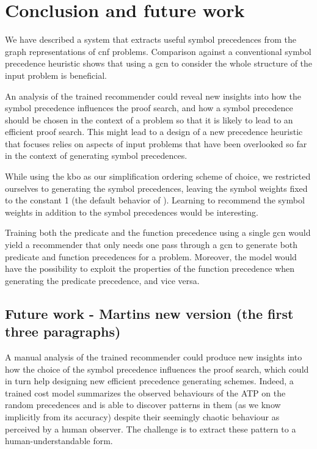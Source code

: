 \documentclass[runningheads]{llncs}
\begin{document}

\section{Conclusion and future work}
\label{sec:conclusion}

We have described a system that extracts useful symbol precedences from the graph representations of \gls{cnf} problems.
Comparison against a conventional symbol precedence heuristic shows that using a \gls{gcn}
to consider the whole structure of the input problem is beneficial.

An analysis of the trained recommender could reveal new insights into how the symbol precedence influences the proof search,
and how a symbol precedence should be chosen in the context of a problem so that it is likely to lead to an efficient proof search.
This might lead to a design of a new precedence heuristic
that focuses relies on aspects of input problems
that have been overlooked so far in the context of generating symbol precedences.

While using the \gls{kbo} as our simplification ordering scheme of choice,
we restricted ourselves to generating the symbol precedences,
leaving the symbol weights fixed to the constant 1 (the default behavior of \Vampire{}).
Learning to recommend the symbol weights in addition to the symbol precedences would be interesting.

Training both the predicate and the function precedence using a single \gls{gcn} would yield a recommender
that only needs one pass through a \gls{gcn} to generate both predicate and function precedences for a problem.
Moreover, the model would have the possibility to exploit the properties of the function precedence
when generating the predicate precedence, and vice versa.

\subsection{Future work - Martins new version (the first three paragraphs)}

A manual analysis of the trained recommender could produce new insights into how the choice of the symbol precedence influences the proof search,
which could in turn help designing new efficient precedence generating schemes.
Indeed, a trained cost model summarizes the observed behaviours of the ATP on the random precedences
and is able to discover patterns in them (as we know implicitly from its accuracy) 
despite their seemingly chaotic behaviour as perceived by a human observer.
The challenge is to extract these pattern to a human-understandable form.
\end{document}
